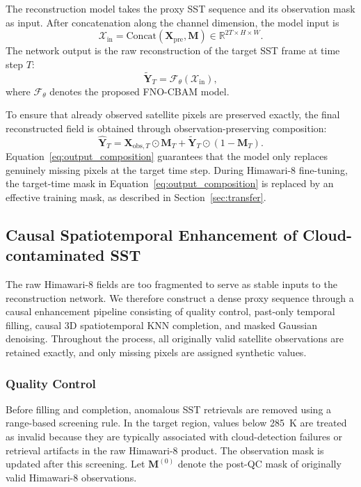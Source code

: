 \documentclass[12pt,reqno]{amsart}
\begin{document}
The reconstruction model takes the proxy SST sequence and its observation mask as input. After concatenation along the channel dimension, the model input is
\begin{equation}
\mathcal{X}_{\mathrm{in}} = \mathrm{Concat}(\mathbf{X}_{\mathrm{pre}},\mathbf{M}) \in \mathbb{R}^{2T\times H\times W}.
\end{equation}
The network output is the raw reconstruction of the target SST frame at time step $T$:
\begin{equation}
\tilde{\mathbf{Y}}_T = \mathcal{F}_{\theta}(\mathcal{X}_{\mathrm{in}}),
\end{equation}
where $\mathcal{F}_{\theta}$ denotes the proposed FNO-CBAM model.

To ensure that already observed satellite pixels are preserved exactly, the final reconstructed field is obtained through observation-preserving composition:
\begin{equation}
\hat{\mathbf{Y}}_T = \mathbf{X}_{\mathrm{obs},T}\odot\mathbf{M}_T + \tilde{\mathbf{Y}}_T\odot(1-\mathbf{M}_T).
\label{eq:output_composition}
\end{equation}
Equation~\eqref{eq:output_composition} guarantees that the model only replaces genuinely missing pixels at the target time step. During Himawari-8 fine-tuning, the target-time mask in Equation~\eqref{eq:output_composition} is replaced by an effective training mask, as described in Section~\ref{sec:transfer}.

\subsection{Causal Spatiotemporal Enhancement of Cloud-contaminated SST}
\label{sec:enhancement}

The raw Himawari-8 fields are too fragmented to serve as stable inputs to the reconstruction network. We therefore construct a dense proxy sequence through a causal enhancement pipeline consisting of quality control, past-only temporal filling, causal 3D spatiotemporal KNN completion, and masked Gaussian denoising. Throughout the process, all originally valid satellite observations are retained exactly, and only missing pixels are assigned synthetic values.

\subsubsection{Quality Control}

Before filling and completion, anomalous SST retrievals are removed using a range-based screening rule. In the target region, values below 285~K are treated as invalid because they are typically associated with cloud-detection failures or retrieval artifacts in the raw Himawari-8 product. The observation mask is updated after this screening. Let $\mathbf{M}^{(0)}$ denote the post-QC mask of originally valid Himawari-8 observations.
\end{document}
